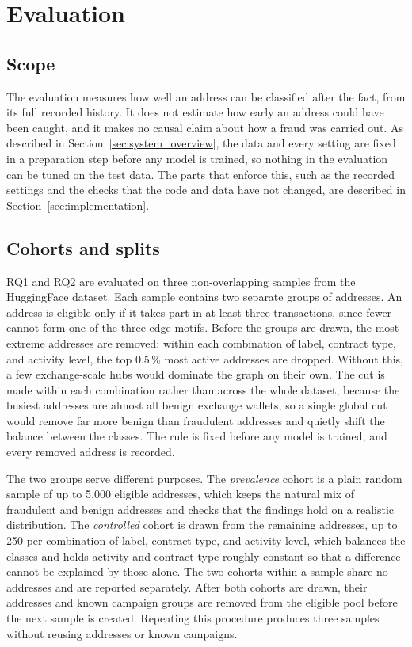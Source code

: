 \section{Evaluation}
\label{sec:evaluation_protocol}

\subsection{Scope}

The evaluation measures how well an address can be classified after the fact, from
its full recorded history. It does not estimate how early an address could have
been caught, and it makes no causal claim about how a fraud was carried out. As
described in Section~\ref{sec:system_overview}, the data and every setting are
fixed in a preparation step before any model is trained, so nothing in the
evaluation can be tuned on the test data. The parts that enforce this, such as the
recorded settings and the checks that the code and data have not changed, are
described in Section~\ref{sec:implementation}.

\subsection{Cohorts and splits}

RQ1 and RQ2 are evaluated on three non-overlapping samples from the HuggingFace
dataset. Each sample contains two separate groups of addresses. An address is
eligible only if it takes part in at least three transactions, since
fewer cannot form one of the three-edge motifs. Before the groups are drawn, the
most extreme addresses are removed: within each combination of label, contract
type, and activity level, the top 0.5\,\% most active addresses are dropped.
Without this, a few exchange-scale hubs would dominate the graph on their own. The
cut is made within each combination rather than across the whole dataset, because
the busiest addresses are almost all benign exchange wallets, so a single global
cut would remove far more benign than fraudulent addresses and quietly shift the
balance between the classes. The rule is fixed before any model is trained, and
every removed address is recorded.

The two groups serve different purposes. The \emph{prevalence} cohort is a plain
random sample of up to 5{,}000 eligible addresses, which keeps the natural mix of
fraudulent and benign addresses and checks that the findings hold on a realistic
distribution. The \emph{controlled} cohort is drawn from the remaining addresses,
up to 250 per combination of label, contract type, and activity level, which
balances the classes and holds activity and contract type roughly constant so that
a difference cannot be explained by those alone. The two cohorts within a
sample share no addresses and are reported separately. After both cohorts are
drawn, their addresses and known campaign groups are removed from the eligible
pool before the next sample is created. Repeating this procedure produces three
samples without reusing addresses or known campaigns.

